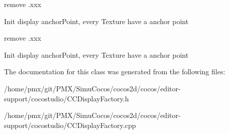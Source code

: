 remove .xxx

Init display anchor\+Point, every Texture have a anchor point

remove .xxx

Init display anchor\+Point, every Texture have a anchor point 

The documentation for this class was generated from the following files\+:\begin{DoxyCompactItemize}
\item 
/home/pmx/git/\+P\+M\+X/\+Simu\+Cocos/cocos2d/cocos/editor-\/support/cocostudio/C\+C\+Display\+Factory.\+h\item 
/home/pmx/git/\+P\+M\+X/\+Simu\+Cocos/cocos2d/cocos/editor-\/support/cocostudio/C\+C\+Display\+Factory.\+cpp\end{DoxyCompactItemize}
